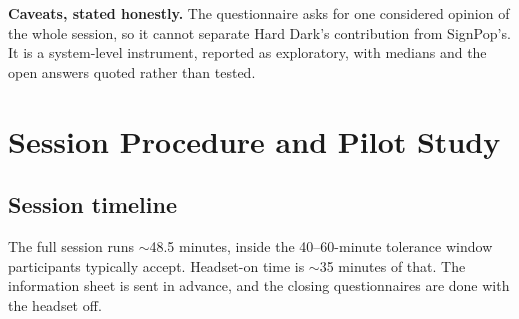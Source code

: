\textbf{Caveats, stated honestly.} The questionnaire asks for one considered opinion of the whole
session, so it cannot separate Hard Dark's contribution from SignPop's. It is a system-level
instrument, reported as exploratory, with medians and the open answers quoted rather than tested.

\section{Session Procedure and Pilot Study}

\subsection{Session timeline}

The full session runs $\sim$48.5 minutes, inside the 40–60-minute tolerance window participants
typically accept. Headset-on time is $\sim$35 minutes of that. The information sheet is sent in
advance, and the closing questionnaires are done with the headset off.

